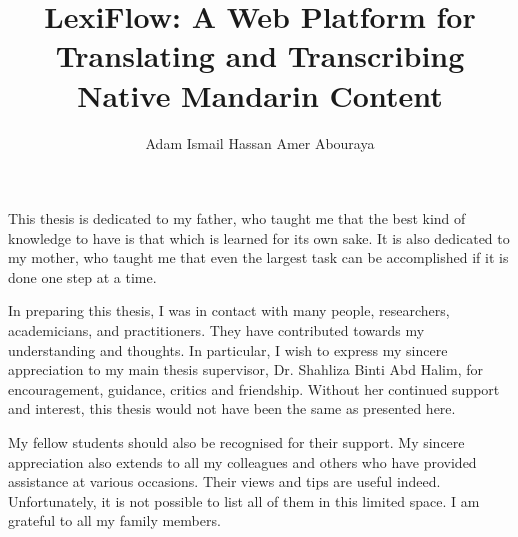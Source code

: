 \documentclass[oneside]{utmthesis}
\title{LexiFlow: A Web Platform for Translating and Transcribing Native Mandarin Content}
\author{Adam Ismail Hassan Amer Abouraya}
\begin{document}
\coverpage
% 
\superpage
\certification

\frontmatter
\maketitle
\declaration

\normalsize

\begin{dedication}
    This thesis is dedicated to my father, who taught me that the best kind of knowledge to have is that which is learned for its own sake. It is also dedicated to my mother, who taught me that even the largest task can be accomplished if it is done one step at a time.\
\end{dedication}

\begin{acknowledgement}
    In preparing this thesis, I was in contact with many people, researchers, academicians, and practitioners. They have contributed towards my understanding and thoughts. In particular, I wish to express my sincere appreciation to my main thesis supervisor, Dr. Shahliza Binti Abd Halim, for encouragement, guidance, critics and friendship. Without her continued support and interest, this thesis would not have been the same as presented here.

    My fellow students should also be recognised for their support. My sincere appreciation also extends to all my colleagues and others who have provided assistance at various occasions. Their views and tips are useful indeed. Unfortunately, it is not possible to list all of them in this limited space. I am grateful to all my family members.
\end{acknowledgement}
\end{document}

